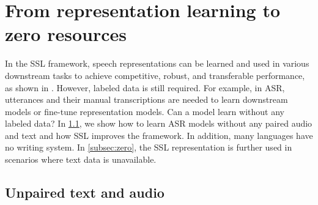 
\section{From representation learning to zero resources}
\label{sec:zero}



In the SSL framework, speech representations can be
learned and used in various downstream tasks to achieve competitive, robust,
and transferable performance, as shown in
. 
However, labeled data is still required. 
For example, in ASR, utterances and their manual transcriptions are needed to learn downstream models or fine-tune representation models. 
Can a model learn without any labeled data? 
In \cref{secsec:unpaired}, we show how to learn ASR models without any paired audio and text and how SSL improves the framework.
In addition, many languages have no writing system. 
In \cref{subsec:zero}, the SSL representation is further used in scenarios where text data is unavailable.

\subsection{Unpaired text and audio} \label{secsec:unpaired}

